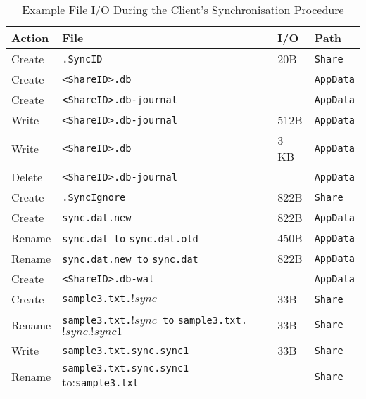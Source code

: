 \documentclass[final,5p,times,twocolumn]{elsarticle}
\begin{document}
\begin{table}[t]
\begin{tabular}{|l|p{1.5in}|l|l|}
\hline
\textbf{Action} & \textbf{File}  & \textbf{I/O}  &  \textbf{Path}  \\ \hline
Create & \texttt{\small .SyncID}  & 20B  & \texttt{Share} \\ \hline
Create & \texttt{\small <ShareID>.db}  & \- & \texttt{AppData} \\ \hline
Create & \texttt{\small <ShareID>.db-journal} & \- & \texttt{AppData} \\ \hline
Write &   \texttt{\small <ShareID>.db-journal} & 512B & \texttt{AppData} \\ \hline
Write &  \texttt{\small <ShareID>.db} & 3 KB & \texttt{AppData} \\ \hline
Delete & \texttt{\small <ShareID>.db-journal} & \- & \texttt{AppData} \\ \hline
Create & \texttt{\small .SyncIgnore} & 822B & \texttt{Share} \\ \hline
Create & \texttt{\small sync.dat.new} & 822B & \texttt{AppData} \\ \hline
Rename & \texttt{\small sync.dat to} \texttt{sync.dat.old} & 450B & \texttt{AppData} \\ \hline
Rename & \texttt{\small sync.dat.new to} \texttt{sync.dat} & 822B & \texttt{AppData} \\ \hline
Create & \texttt{\small <ShareID>.db-wal} & \- & \texttt{AppData} \\ \hline
Create & \texttt{\small sample3.txt.$!sync$} & 33B & \texttt{Share} \\ \hline
Rename & \texttt{\small sample3.txt.$!sync$ to} \texttt{sample3.txt.$!sync.!sync1$} & 33B & \texttt{Share} \\ \hline
Write & \texttt{\small sample3.txt.\!sync.\!sync1} & 33B & \texttt{Share} \\ \hline
Rename & \texttt{\small sample3.txt.\!sync.\!sync1} to:\texttt{sample3.txt} & \- & \texttt{Share} \\ \hline
\end{tabular}
\caption{Example File I/O During the Client's Synchronisation Procedure}
\label{tab:synchro}
\end{table}
\end{document}
